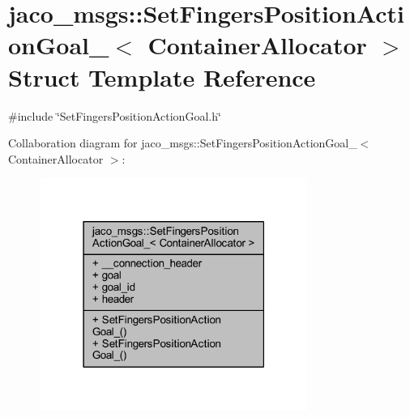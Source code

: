\hypertarget{structjaco__msgs_1_1SetFingersPositionActionGoal__}{}\section{jaco\+\_\+msgs\+:\+:Set\+Fingers\+Position\+Action\+Goal\+\_\+$<$ Container\+Allocator $>$ Struct Template Reference}
\label{structjaco__msgs_1_1SetFingersPositionActionGoal__}


{\ttfamily \#include \char`\"{}Set\+Fingers\+Position\+Action\+Goal.\+h\char`\"{}}



Collaboration diagram for jaco\+\_\+msgs\+:\+:Set\+Fingers\+Position\+Action\+Goal\+\_\+$<$ Container\+Allocator $>$\+:
\nopagebreak
\begin{figure}[H]
\begin{center}
\leavevmode
\includegraphics[width=247pt]{d3/d30/structjaco__msgs_1_1SetFingersPositionActionGoal____coll__graph}
\end{center}
\end{figure}

